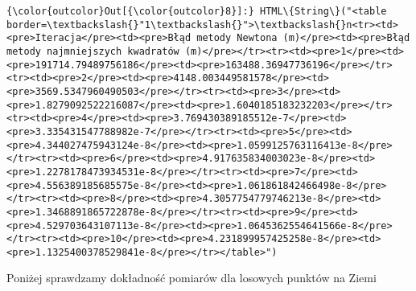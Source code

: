 \documentclass[11pt]{article}
\begin{document}
\begin{Verbatim}[commandchars=\\\{\}]
{\color{outcolor}Out[{\color{outcolor}8}]:} HTML\{String\}("<table border=\textbackslash{}"1\textbackslash{}">\textbackslash{}n<tr><td><pre>Iteracja</pre><td><pre>Błąd metody Newtona (m)</pre><td><pre>Błąd metody najmniejszych kwadratów (m)</pre></tr><tr><td><pre>1</pre><td><pre>191714.79489756186</pre><td><pre>163488.36947736196</pre></tr><tr><td><pre>2</pre><td><pre>4148.003449581578</pre><td><pre>3569.5347960490503</pre></tr><tr><td><pre>3</pre><td><pre>1.8279092522216087</pre><td><pre>1.6040185183232203</pre></tr><tr><td><pre>4</pre><td><pre>3.769430389185512e-7</pre><td><pre>3.335431547788982e-7</pre></tr><tr><td><pre>5</pre><td><pre>4.344027475943124e-8</pre><td><pre>1.0599125763116413e-8</pre></tr><tr><td><pre>6</pre><td><pre>4.917635834003023e-8</pre><td><pre>1.2278178473934531e-8</pre></tr><tr><td><pre>7</pre><td><pre>4.556389185685575e-8</pre><td><pre>1.061861842466498e-8</pre></tr><tr><td><pre>8</pre><td><pre>4.3057754779746213e-8</pre><td><pre>1.3468891865722878e-8</pre></tr><tr><td><pre>9</pre><td><pre>4.529703643107113e-8</pre><td><pre>1.0645362554641566e-8</pre></tr><tr><td><pre>10</pre><td><pre>4.231899957425258e-8</pre><td><pre>1.1325400378529841e-8</pre></tr></table>")
\end{Verbatim}
            
    Poniżej sprawdzamy dokładność pomiarów dla losowych punktów na Ziemi
\end{document}
